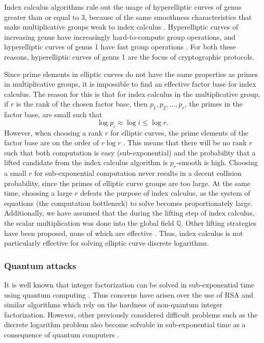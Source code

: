 \documentclass{article}
\begin{document}
    Index calculus algorithms rule out the usage of hyperelliptic curves of
    genus greater than or equal to 3, because of the same smoothness
    characteristics that make multiplicative groups weak to index calculus
    \cite{Theriault2003} \cite{Gaudry2000}. Hyperelliptic curves of increasing
    genus have increasingly hard-to-compute group operations, and hyperelliptic
    curves of genus 1 have fast group operations \cite{Costello2012}. For both
    these reasons, hyperelliptic curves of genus 1 are the focus of
    cryptographic protocols.

    Since prime elements in elliptic curves do not have the same properties as
    primes in multiplicative groups, it is impossible to find an effective
    factor base for index calculus. The reason for this is that for index
    calculus in the multiplicative group, if $r$ is the rank of the chosen
    factor base, then $p_1, p_2, ..., p_r$, the primes in the factor base, are
    small such that
    \begin{equation}
        \log{p_i} \approx \log{i} \le \log{r}.
    \end{equation}
    However, when choosing a rank $r$ for elliptic curves, the prime elements
    of the factor base are on the order of $r\log{r}$ \cite{Silverman1998}.
    This means that there will be no rank $r$ such that both computation is
    easy (sub-exponential) and the probability that a lifted candidate from the
    index calculus algorithm is $p_r$-smooth is high. Choosing a small $r$ for
    sub-exponential computation never results in a decent collision
    probability, since the primes of elliptic curve groups are too large. At
    the same time, choosing a large $r$ defeats the purpose of index calculus,
    as the system of equations (the computation bottleneck) to solve becomes
    proportionately large.  Additionally, we have assumed that the during the
    lifting step of index calculus, the scalar multiplication was done into the
    global field $\mathbb{Q}$.  Other lifting strategies have been proposed,
    none of which are effective \cite{Silverman2009}. Thus, index calculus is
    not particularly effective for solving elliptic curve discrete logarithms. 


\subsubsection{Quantum attacks}
    It is well known that integer factorization can be solved in
    sub-exponential time using quantum computing \cite{quant_fac}
    \cite{shor_fac}. Thus concerns have arisen over the use of RSA and similar
    algorithms which rely on the hardness of non-quantum integer factorization.
    However, other previously considered difficult problems such as the
    discrete logarithm problem also become solvable in sub-exponential time as
    a consequence of quantum computers \cite{bern_quant}.
\end{document}

